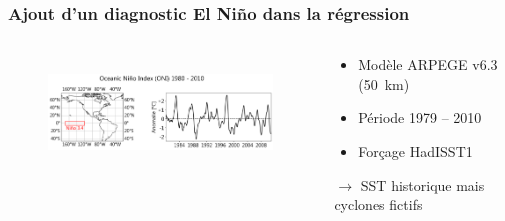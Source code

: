 \documentclass[aspectratio=169, usepdftitle=false, xcolor={dvipsnames}, 9pt,table]{beamer}
\begin{document}
\begin{frame}[t]
    \frametitle{Ajout d'un diagnostic El Niño dans la régression}
    \scriptsize
    \begin{columns}
        \begin{column}{0.62\textwidth}
            \vspace{-3em} 
            \begin{figure}[htpb]
                \centering
                \includegraphics[height=3cm]{Figures/ONI.png}
            \end{figure} 
        \end{column}
        \begin{column}{0.38\textwidth}
            \begin{definition}
                \setlength{\leftmargini}{2.5ex}
                \begin{itemize}
                    \item Modèle ARPEGE v6.3 (50~km) \parencite{voldoire_evaluation_2019}
                    \item Période 1979 -- 2010
                    \item Forçage HadISST1
                \end{itemize}
                $\longrightarrow$ SST \alert{historique} mais cyclones \alert{fictifs}
            \end{definition}
        \end{column}
    \end{columns}
    \vspace{2em}
\end{frame}
\end{document}
